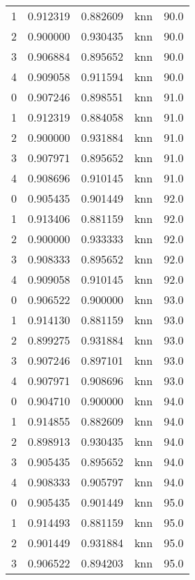 \begin{tabular}{rrrlr}
     1 & 0.912319 & 0.882609 &      knn &       90.0 \\
     2 & 0.900000 & 0.930435 &      knn &       90.0 \\
     3 & 0.906884 & 0.895652 &      knn &       90.0 \\
     4 & 0.909058 & 0.911594 &      knn &       90.0 \\
     0 & 0.907246 & 0.898551 &      knn &       91.0 \\
     1 & 0.912319 & 0.884058 &      knn &       91.0 \\
     2 & 0.900000 & 0.931884 &      knn &       91.0 \\
     3 & 0.907971 & 0.895652 &      knn &       91.0 \\
     4 & 0.908696 & 0.910145 &      knn &       91.0 \\
     0 & 0.905435 & 0.901449 &      knn &       92.0 \\
     1 & 0.913406 & 0.881159 &      knn &       92.0 \\
     2 & 0.900000 & 0.933333 &      knn &       92.0 \\
     3 & 0.908333 & 0.895652 &      knn &       92.0 \\
     4 & 0.909058 & 0.910145 &      knn &       92.0 \\
     0 & 0.906522 & 0.900000 &      knn &       93.0 \\
     1 & 0.914130 & 0.881159 &      knn &       93.0 \\
     2 & 0.899275 & 0.931884 &      knn &       93.0 \\
     3 & 0.907246 & 0.897101 &      knn &       93.0 \\
     4 & 0.907971 & 0.908696 &      knn &       93.0 \\
     0 & 0.904710 & 0.900000 &      knn &       94.0 \\
     1 & 0.914855 & 0.882609 &      knn &       94.0 \\
     2 & 0.898913 & 0.930435 &      knn &       94.0 \\
     3 & 0.905435 & 0.895652 &      knn &       94.0 \\
     4 & 0.908333 & 0.905797 &      knn &       94.0 \\
     0 & 0.905435 & 0.901449 &      knn &       95.0 \\
     1 & 0.914493 & 0.881159 &      knn &       95.0 \\
     2 & 0.901449 & 0.931884 &      knn &       95.0 \\
     3 & 0.906522 & 0.894203 &      knn &       95.0 \\

\end{tabular}
